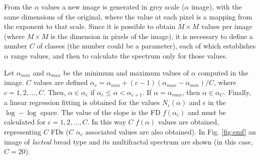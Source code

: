 \documentclass[oneside,a4paper,english,links]{article}
\begin{document}
From the $\alpha$ values a new image is generated in grey scale ($\alpha$ image), with the same dimensions of the original, where the value at each pixel is a mapping from the exponent to that scale. Since it is possible to obtain $M\times M$ values per image (where $M\times M$ is the dimension in pixels of the image), it is necessary to define a number $C$ of classes (the number could be a parameter), each of which establishes $\alpha$ range values, and then to calculate the spectrum only for those values.

Let $\alpha_{min}$ and  $\alpha_{max}$ be the minimum and maximum values of $\alpha$ computed in the image. $C$ values are defined $\alpha_{c} = \alpha_{min} + (c-1)(\alpha_{max}-\alpha_{min})/C$, where $c = 1,2,\dots,C$. Then, $\alpha \in \alpha_{c}$ if $\alpha_{c} \leq \alpha < \alpha_{c+1}$. If $\alpha = \alpha_{max}$, then $\alpha \in \alpha_{C}$. Finally, a linear regression fitting is obtained for the values $N_{\epsilon}(\alpha)$ and $\epsilon$ in the $\log-\log$ space. The value of the slope is the FD $f(\alpha_{c})$ and must be calculated for $c = 1,2,\dots,C$. In this way $C$ $f(\alpha)$ values are obtained, representing $C$ FDs ($C$ $\alpha_{c}$ associated values are also obtained). In Fig. \ref{fig:emf} an image of {\em lacteal} bread type and its multifractal spectrum are shown (in this case, $C = 20$).
\end{document}
